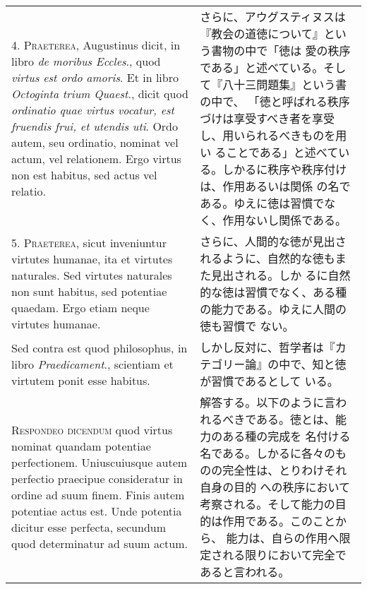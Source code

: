 \documentclass[10pt]{jsarticle}
\begin{document}
\begin{longtable}{p{21em}p{21em}}
\\



4. {\scshape Praeterea}, Augustinus dicit, in libro {\itshape de
moribus Eccles}., quod {\itshape virtus est ordo amoris}. Et in libro
{\itshape Octoginta trium Quaest}., dicit quod {\itshape ordinatio
quae virtus vocatur, est fruendis frui, et utendis uti}. Ordo autem,
seu ordinatio, nominat vel actum, vel relationem. Ergo virtus non est
habitus, sed actus vel relatio.

&

さらに、アウグスティヌスは『教会の道徳について』という書物の中で「徳は
愛の秩序である」と述べている。そして『八十三問題集』という書の中で、
「徳と呼ばれる秩序づけは享受すべき者を享受し、用いられるべきものを用い
ることである」と述べている。しかるに秩序や秩序付けは、作用あるいは関係
の名である。ゆえに徳は習慣でなく、作用ないし関係である。

\\

5. {\scshape Praeterea}, sicut inveniuntur virtutes humanae, ita et
virtutes naturales. Sed virtutes naturales non sunt habitus, sed
potentiae quaedam. Ergo etiam neque virtutes humanae.

&

さらに、人間的な徳が見出されるように、自然的な徳もまた見出される。しか
るに自然的な徳は習慣でなく、ある種の能力である。ゆえに人間の徳も習慣で
ない。

\\

Sed contra est quod philosophus, in libro {\itshape Praedicament}.,
scientiam et virtutem ponit esse habitus.

&

しかし反対に、哲学者は『カテゴリー論』の中で、知と徳が習慣であるとして
いる。

\\



{\scshape Respondeo dicendum} quod virtus nominat quandam potentiae
perfectionem. Uniuscuiusque autem perfectio praecipue consideratur in
ordine ad suum finem. Finis autem potentiae actus est. Unde potentia
dicitur esse perfecta, secundum quod determinatur ad suum actum.

&

解答する。以下のように言われるべきである。徳とは、能力のある種の完成を
名付ける名である。しかるに各々のものの完全性は、とりわけそれ自身の目的
への秩序において考察される。そして能力の目的は作用である。このことから、
能力は、自らの作用へ限定される限りにおいて完全であると言われる。


\end{longtable}
\end{document}
